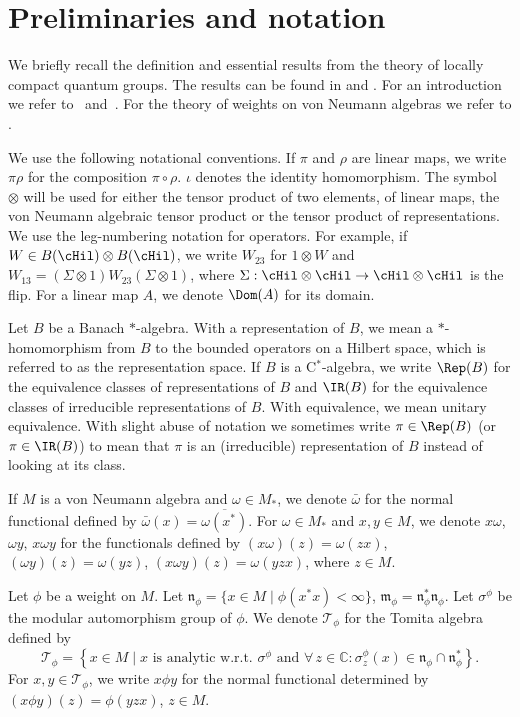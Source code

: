 \section{Preliminaries and notation}\label{SectPreliminaries}

We brief\/ly recall the def\/inition and essential results from the theory of locally compact quantum groups. The results can be found in \cite{KusVae, KusVaeII} and \cite{Kus}. For an introduction we refer to~\cite{Tim} and~\cite{KusLec}. For the theory of weights on von Neumann algebras we refer to \cite{TakII}.



We use the following notational conventions. If $\pi$ and $\rho$ are linear maps, we write $\pi\rho$ for the composition $\pi \circ \rho$. $\iota$ denotes the identity homomorphism. The symbol $\otimes$ will be used for either the tensor product of two elements, of linear maps, the von Neumann algebraic tensor product or the tensor product of representations. We use the leg-numbering notation for operators. For example, if $W \in B(\cHil) \otimes B(\cHil)$, we write $W_{23}$ for $1 \otimes W$ and $W_{13} = (\Sigma \otimes 1) W_{23}(\Sigma \otimes 1)$, where $\Sigma: \cHil \otimes \cHil \rightarrow \cHil \otimes \cHil$ is the f\/lip.  For a linear map $A$, we denote $\Dom(A)$ for its domain.

Let $B$ be a Banach $\ast$-algebra. With a representation of $B$, we mean a $\ast$-homomorphism from $B$ to the bounded operators on a Hilbert space, which is referred to as the representation space. If $B$ is a C$^\ast$-algebra, we write $\Rep(B)$ for the equivalence classes of representations of $B$ and $\IR(B)$ for the equivalence classes of irreducible representations of $B$. With equivalence, we mean unitary equivalence. With slight abuse of notation we sometimes write $\pi \in \Rep(B)$ (or $\pi \in \IR(B)$) to mean that $\pi$ is an (irreducible) representation of $B$ instead of looking at its class.

 If $M$ is a von Neumann algebra and $\omega \in M_\ast$, we denote $\bar{\omega}$ for the normal functional def\/ined by $\bar{\omega}(x) = \overline{\omega(x^\ast)}$. For $\omega \in M_\ast$ and $x,y \in M$, we denote $x\omega$, $\omega y$, $x \omega y$ for the functionals def\/ined by $(x\omega)(z) = \omega(zx)$, $(\omega y)(z) = \omega(yz)$, $(x\omega y)(z) = \omega(yzx)$, where $z \in M$.

 Let $\phi$ be a weight on  $M$. Let $\mathfrak{n}_\phi = \{ x
\in M \mid \phi(x^\ast x) < \infty \}$, $\mathfrak{m}_\phi =
\mathfrak{n}_\phi^\ast \mathfrak{n}_\phi$. Let $\sigma^\phi$ be the modular automorphism group of $\phi$. We denote $\mathcal{T}_\phi$ for the Tomita
algebra def\/ined by
\[
 \mathcal{T}_\phi = \left\{ x \in M \mid x \textrm{ is analytic w.r.t. } \sigma^\phi \textrm{ and } \forall \,z \in \mathbb{C}: \sigma_z^\phi(x) \in \mathfrak{n}_\phi \cap \mathfrak{n}_\phi^\ast \right\}.
\]
For $x,y \in \mathcal{T}_\phi$, we write $x \phi y$ for the normal functional determined by $(x \phi y)(z) = \phi(yzx)$, $z \in M$.

